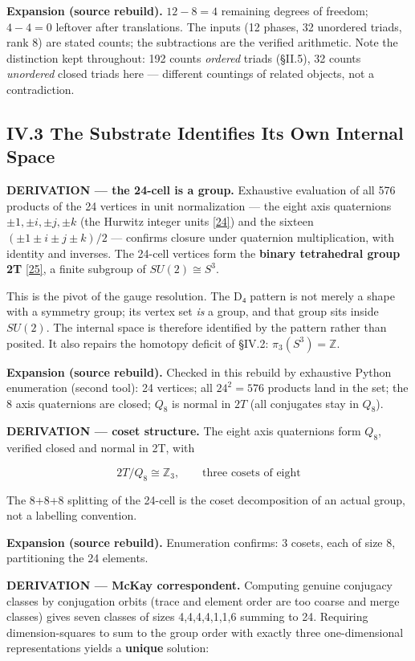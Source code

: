 \documentclass[a4paper,11pt]{article}
\newcommand{\expansion}[1]{\par\smallskip\noindent\textbf{Expansion (source rebuild).} #1\par\smallskip}
\begin{document}
\expansion{$12 - 8 = 4$ remaining degrees of freedom; $4 - 4 = 0$ leftover after translations. The inputs (12 phases, 32 unordered triads, rank 8) are stated counts; the subtractions are the verified arithmetic. Note the distinction kept throughout: 192 counts \emph{ordered} triads (\S II.5), 32 counts \emph{unordered} closed triads here --- different countings of related objects, not a contradiction.}
\subsection*{IV.3 The Substrate Identifies Its Own Internal Space}

\textbf{DERIVATION — the 24-cell is a group.} Exhaustive evaluation of all 576 products of the 24 vertices in unit normalization — the eight axis quaternions $\pm1,\pm i,\pm j,\pm k$ (the Hurwitz integer units \hyperref[ref24]{[24]}) and the sixteen $(\pm1\pm i\pm j\pm k)/2$ — confirms closure under quaternion multiplication, with identity and inverses. The 24-cell vertices form the \textbf{binary tetrahedral group 2T} \hyperref[ref25]{[25]}, a finite subgroup of $SU(2)\cong S^3$.

This is the pivot of the gauge resolution. The D₄ pattern is not merely a shape with a symmetry group; its vertex set \textit{is} a group, and that group sits inside $SU(2)$. The internal space is therefore identified by the pattern rather than posited. It also repairs the homotopy deficit of §IV.2: $\pi_3(S^3)=\mathbb{Z}$.


\expansion{Checked in this rebuild by exhaustive Python enumeration (second tool): 24 vertices; all $24^2 = 576$ products land in the set; the 8 axis quaternions are closed; $Q_8$ is normal in $2T$ (all conjugates stay in $Q_8$).}
\textbf{DERIVATION — coset structure.} The eight axis quaternions form $Q_8$, verified closed and normal in 2T, with

\[2T/Q_8\cong\mathbb{Z}_3,\qquad\text{three cosets of eight}\]

The 8+8+8 splitting of the 24-cell is the coset decomposition of an actual group, not a labelling convention.


\expansion{Enumeration confirms: 3 cosets, each of size 8, partitioning the 24 elements.}
\textbf{DERIVATION — McKay correspondent.} Computing genuine conjugacy classes by conjugation orbits (trace and element order are too coarse and merge classes) gives seven classes of sizes 4,4,4,4,1,1,6 summing to 24. Requiring dimension-squares to sum to the group order with exactly three one-dimensional representations yields a \textbf{unique} solution:
\end{document}
